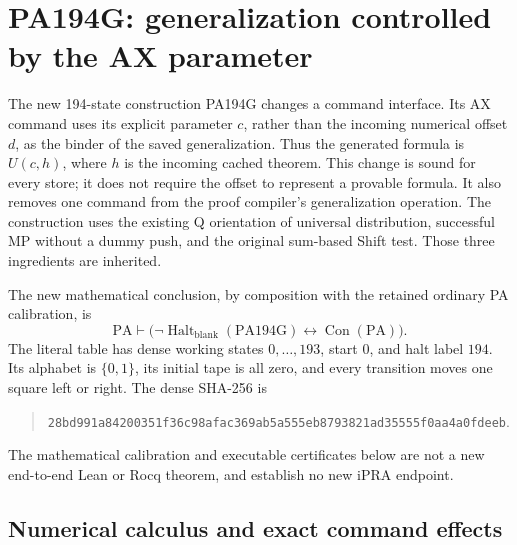\section{PA194G: generalization controlled by the AX parameter}
\label{sec:pa194g}

The new 194-state construction PA194G changes a command interface. Its AX
command uses its explicit parameter $c$, rather than the incoming numerical
offset $d$, as the binder of the saved generalization. Thus the generated
formula is $U(c,h)$, where $h$ is the incoming cached theorem. This change
is sound for every store; it does not require the offset to represent a
provable formula. It also removes one command from the proof compiler's
generalization operation. The construction uses the existing Q orientation
of universal distribution, successful MP without a dummy push, and the
original sum-based Shift test. Those three ingredients are inherited.

The new mathematical conclusion, by composition with the retained ordinary
PA calibration, is
\[
 \mathrm{PA}\vdash
 \bigl(\neg\operatorname{Halt}_{\mathrm{blank}}(\mathrm{PA194G})
       \leftrightarrow\operatorname{Con}(\mathrm{PA})\bigr).
\]
The literal table has dense working states $0,\ldots,193$, start $0$, and
halt label $194$. Its alphabet is $\{0,1\}$, its initial tape is all zero,
and every transition moves one square left or right. The dense SHA-256 is
\begin{quote}\small\nolinkurl{28bd991a84200351f36c98afac369ab5a555eb8793821ad35555f0aa4a0fdeeb}.\end{quote}
The mathematical calibration and executable certificates below are not a
new end-to-end Lean or Rocq theorem, and establish no new iPRA endpoint.

\subsection{Numerical calculus and exact command effects}

